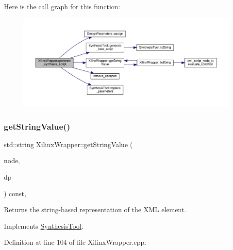 Here is the call graph for this function\+:
\nopagebreak
\begin{figure}[H]
\begin{center}
\leavevmode
\includegraphics[width=350pt]{d4/da0/classXilinxWrapper_a535252db25a8a37fd956ee1915c760e2_cgraph}
\end{center}
\end{figure}
\mbox{\label{classXilinxWrapper_a1a3f3f256c4552c913ad26396a7f3bab}} 
\subsubsection{\texorpdfstring{get\+String\+Value()}{getStringValue()}}
{\footnotesize\ttfamily std\+::string Xilinx\+Wrapper\+::get\+String\+Value (\begin{DoxyParamCaption}\item[{const \hyperlink{xml__script__command_8hpp_a1fe3d50ade66bc35e41be9b68bbbcd02}{xml\+\_\+script\+\_\+node\+\_\+t\+Ref}}]{node,  }\item[{const \hyperlink{DesignParameters_8hpp_ae36bb1c4c9150d0eeecfe1f96f42d157}{Design\+Parameters\+Ref} \&}]{dp }\end{DoxyParamCaption}) const\hspace{0.3cm}{\ttfamily [override]}, {\ttfamily [virtual]}}



Returns the string-\/based representation of the X\+ML element. 



Implements \hyperlink{classSynthesisTool_a730699a51a36280c89b32f324dedc1a7}{Synthesis\+Tool}.



Definition at line 104 of file Xilinx\+Wrapper.\+cpp.



